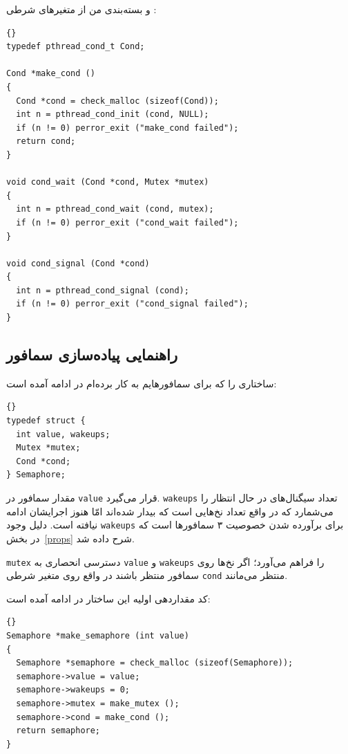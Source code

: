 \documentclass{book}
\newcommand{\clearemptydoublepage}{}%
\begin{document}
\newpage
    و بسته‌بندی من از متغیرهای شرطی :


\begin{latin}
\begin{lstlisting}[title={}]{}
typedef pthread_cond_t Cond;

Cond *make_cond ()
{
  Cond *cond = check_malloc (sizeof(Cond)); 
  int n = pthread_cond_init (cond, NULL);
  if (n != 0) perror_exit ("make_cond failed");
  return cond;
}

void cond_wait (Cond *cond, Mutex *mutex)
{
  int n = pthread_cond_wait (cond, mutex);
  if (n != 0) perror_exit ("cond_wait failed");
}

void cond_signal (Cond *cond)
{
  int n = pthread_cond_signal (cond);
  if (n != 0) perror_exit ("cond_signal failed");
}
\end{lstlisting}
\end{latin}



\clearemptydoublepage
\subsection{راهنمایی پیاده‌سازی سمافور}

     ساختاری را که برای سمافورهایم به کار برده‌ام در ادامه آمده است:

\begin{latin}
\begin{lstlisting}[title={}]{}
typedef struct {
  int value, wakeups;
  Mutex *mutex;
  Cond *cond;
} Semaphore;
\end{lstlisting}
\end{latin}

    مقدار سمافور در {\tt value} قرار می‌گیرد.  {\tt wakeups} تعداد سیگنال‌های در حال انتظار را می‌شمارد که در واقع تعداد نخ‌هایی است که 
    بیدار شده‌اند امّا هنوز اجرایشان ادامه نیافته است. دلیل وجود {\tt wakeups} برای برآورده شدن خصوصیت ۳ سمافورها است که در بخش~\ref{props} 
    شرح داده شد. 
    

    {\tt mutex} 
    دسترسی انحصاری به  {\tt value} و {\tt wakeups} را فراهم می‌آورد؛ 
     اگر  نخ‌ها روی سمافور منتظر باشند در واقع روی متغیر شرطی   {\tt cond}  منتظر می‌مانند. 

    کد مقداردهی اولیه این ساختار در ادامه آمده است:

\begin{latin}
\begin{lstlisting}[title={}]{}
Semaphore *make_semaphore (int value)
{
  Semaphore *semaphore = check_malloc (sizeof(Semaphore));
  semaphore->value = value;
  semaphore->wakeups = 0;
  semaphore->mutex = make_mutex ();
  semaphore->cond = make_cond ();
  return semaphore;
}
\end{lstlisting}
\end{latin}
\end{document}
